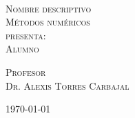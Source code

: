 \begin{titlepage}
\begin{minipage}[c][0.81\textheight][t]{0.75\textwidth}
\begin{center}
      {\color{black}{\large\scshape Proyecto Integrador}}\\[.2in]

      \vspace{1cm}            

      \textsc{\LARGE Nombre descriptivo}\\[2.5cm] %
      \textsc{\large M\'etodos num\'ericos}\\[0.5cm]
      
      {\color{black}\textsc{\large presenta:}}\\[0.5cm]
      \textsc{\large {Alumno }}\\[1cm]          

      \vspace{0.5cm}

      {\large\scshape 
        {\color{black}Profesor}\\[0.3cm] {Dr. Alexis Torres Carbajal}}\\[.2in]

      \vspace{0.5cm}
       
      \large{\today}
    \end{center}
  \end{minipage}
\end{titlepage}
